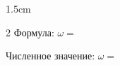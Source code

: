 
\begin{answerboxpart}{1.5cm}
\begin{multicols}{2}
    Формула: \(\omega=\)
    
    \columnbreak
    
    Численное значение: \(\omega=\)
\end{multicols}
\end{answerboxpart}